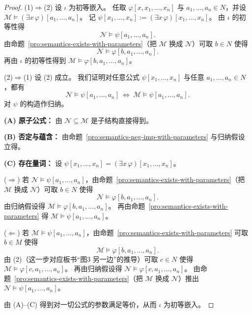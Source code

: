 \documentclass[lang=cn,a4paper,newtx,section]{elegantbook}
\begin{document}
\begin{proof}
(1)$\Rightarrow$(2)
设 $\iota$ 为初等嵌入。
任取 $\varphi[x,x_1,\dots,x_n]$ 与 $a_1,\dots,a_n\in N$，并设 $\mathcal M\models(\exists x\,\varphi)[a_1,\dots,a_n]$。
记 $\psi[x_1,\dots,x_n]:=(\exists x\,\varphi)[x_1,\dots,x_n]$。
由 $\iota$ 的初等性得
\[
  \mathcal N\models\psi[a_1,\dots,a_n].
\]
由命题~\ref{pro:semantics-exists-with-parameters}（把 $\mathcal M$ 换成 $\mathcal N$）可取 $b\in N$ 使得
\[
  \mathcal N\models\varphi[b,a_1,\dots,a_n].
\]
再由 $\iota$ 的初等性得到 $\mathcal M\models\varphi[b,a_1,\dots,a_n]$。

(2)$\Rightarrow$(1)
设 (2) 成立。
我们证明对任意公式 $\psi[x_1,\dots,x_n]$ 与任意 $a_1,\dots,a_n\in N$，都有
\[
  \mathcal N\models\psi[a_1,\dots,a_n]\ \Longleftrightarrow\ \mathcal M\models\psi[a_1,\dots,a_n].
\]
对 $\psi$ 的构造作归纳。

\textbf{(A) 原子公式：} 由 $\mathcal N\subseteq\mathcal M$ 是子结构直接得到。

\textbf{(B) 否定与蕴含：} 由命题~\ref{pro:semantics-neg-imp-with-parameters} 与归纳假设立得。

\textbf{(C) 存在量词：} 设 $\psi[x_1,\dots,x_n]=(\exists x\,\varphi)[x_1,\dots,x_n]$。

($\Rightarrow$) 若 $\mathcal N\models\psi[a_1,\dots,a_n]$，由命题~\ref{pro:semantics-exists-with-parameters}（把 $\mathcal M$ 换成 $\mathcal N$）可取 $b\in N$ 使得
\[
  \mathcal N\models\varphi[b,a_1,\dots,a_n].
\]
由归纳假设得 $\mathcal M\models\varphi[b,a_1,\dots,a_n]$。
再由命题~\ref{pro:semantics-exists-with-parameters} 得 $\mathcal M\models\psi[a_1,\dots,a_n]$。

($\Leftarrow$) 若 $\mathcal M\models\psi[a_1,\dots,a_n]$，由命题~\ref{pro:semantics-exists-with-parameters} 可取 $b\in M$ 使得
\[
  \mathcal M\models\varphi[b,a_1,\dots,a_n].
\]
由 (2)（这一步对应板书“图3 另一边”的推导）可取 $c\in N$ 使得 $\mathcal M\models\varphi[c,a_1,\dots,a_n]$。
再由归纳假设得 $\mathcal N\models\varphi[c,a_1,\dots,a_n]$。
由命题~\ref{pro:semantics-exists-with-parameters}（把 $\mathcal M$ 换成 $\mathcal N$）推出 $\mathcal N\models\psi[a_1,\dots,a_n]$。

由 (A)--(C) 得到对一切公式的参数满足等价，从而 $\iota$ 为初等嵌入。
\end{proof}
\end{document}
